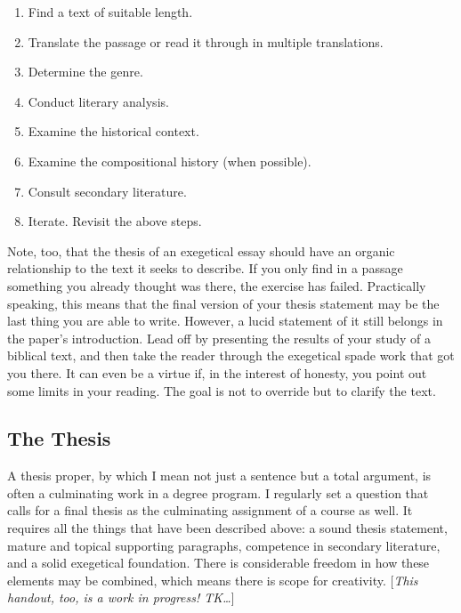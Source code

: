 \documentclass[11pt,twocolumn]{article}
\begin{document}
\begin{enumerate}

\item Find a text of suitable length.

\item Translate the passage or read it through in multiple translations.

\item Determine the genre.

\item Conduct literary analysis.

\item Examine the historical context.

\item Examine the compositional history (when possible).

\item Consult secondary literature.

\item Iterate. Revisit the above steps.

\end{enumerate}

Note, too, that the thesis of an exegetical essay should have an organic
relationship to the text it seeks to describe. If you only find in a
passage something you already thought was there, the exercise has
failed. Practically speaking, this means that the final version of your
thesis statement may be the last thing you are able to write. However, a
lucid statement of it still belongs in the paper's introduction. Lead
off by presenting the results of your study of a biblical text, and then
take the reader through the exegetical spade work that got you there. It
can even be a virtue if, in the interest of honesty, you point out some
limits in your reading. The goal is not to override but to clarify the
text.

\subsection{The Thesis}

A thesis proper, by which I mean not just a sentence but a total
argument, is often a culminating work in a degree program. I regularly
set a question that calls for a final thesis as the culminating
assignment of a course as well. It requires all the things that have
been described above: a sound thesis statement, mature and topical
supporting paragraphs, competence in secondary literature, and a solid
exegetical foundation. There is considerable freedom in how these
elements may be combined, which means there is scope for creativity.
[\emph{This handout, too, is a work in progress! TK\ldots}]
\end{document}
